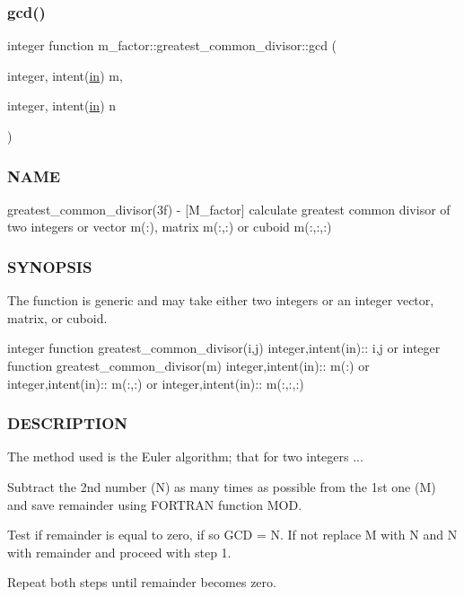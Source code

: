 \subsubsection{\texorpdfstring{gcd()}{gcd()}}
{\footnotesize\ttfamily integer function m\+\_\+factor\+::greatest\+\_\+common\+\_\+divisor\+::gcd (\begin{DoxyParamCaption}\item[{integer, intent(\hyperlink{M__journal_83_8txt_afce72651d1eed785a2132bee863b2f38}{in})}]{m,  }\item[{integer, intent(\hyperlink{M__journal_83_8txt_afce72651d1eed785a2132bee863b2f38}{in})}]{n }\end{DoxyParamCaption})\hspace{0.3cm}{\ttfamily [private]}}



\subsubsection*{N\+A\+ME}

greatest\+\_\+common\+\_\+divisor(3f) -\/ \mbox{[}M\+\_\+factor\mbox{]} calculate greatest common divisor of two integers or vector m(\+:), matrix m(\+:,\+:) or cuboid m(\+:,\+:,\+:) 

\subsubsection*{S\+Y\+N\+O\+P\+S\+IS}

The function is generic and may take either two integers or an integer vector, matrix, or cuboid.

integer function greatest\+\_\+common\+\_\+divisor(i,j) integer,intent(in)\+:\+: i,j or integer function greatest\+\_\+common\+\_\+divisor(m) integer,intent(in)\+:\+: m(\+:) or integer,intent(in)\+:\+: m(\+:,\+:) or integer,intent(in)\+:\+: m(\+:,\+:,\+:)

\subsubsection*{D\+E\+S\+C\+R\+I\+P\+T\+I\+ON}

The method used is the Euler algorithm; that for two integers ...


\begin{DoxyEnumerate}
\item Subtract the 2nd number (N) as many times as possible from the 1st one (M) and save remainder using F\+O\+R\+T\+R\+AN function M\+OD.
\item Test if remainder is equal to zero, if so G\+CD = N. If not replace M with N and N with remainder and proceed with step 1.
\item Repeat both steps until remainder becomes zero.
\end{DoxyEnumerate}

